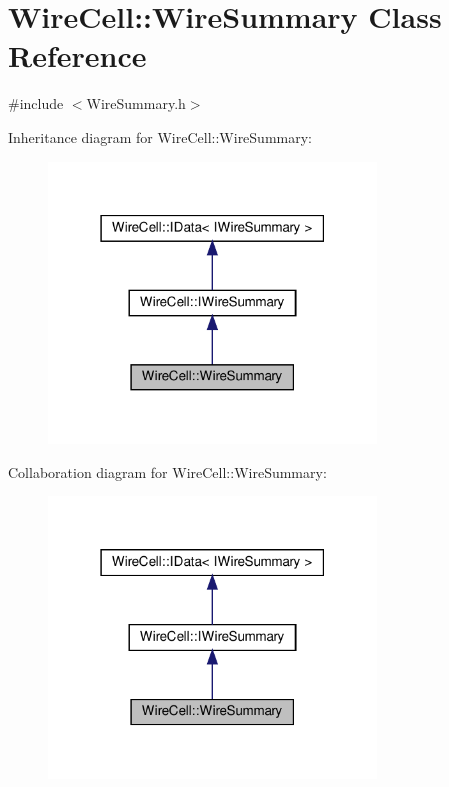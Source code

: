 \hypertarget{class_wire_cell_1_1_wire_summary}{}\section{Wire\+Cell\+:\+:Wire\+Summary Class Reference}
\label{class_wire_cell_1_1_wire_summary}


{\ttfamily \#include $<$Wire\+Summary.\+h$>$}



Inheritance diagram for Wire\+Cell\+:\+:Wire\+Summary\+:
\nopagebreak
\begin{figure}[H]
\begin{center}
\leavevmode
\includegraphics[width=247pt]{class_wire_cell_1_1_wire_summary__inherit__graph}
\end{center}
\end{figure}


Collaboration diagram for Wire\+Cell\+:\+:Wire\+Summary\+:
\nopagebreak
\begin{figure}[H]
\begin{center}
\leavevmode
\includegraphics[width=247pt]{class_wire_cell_1_1_wire_summary__coll__graph}
\end{center}
\end{figure}
